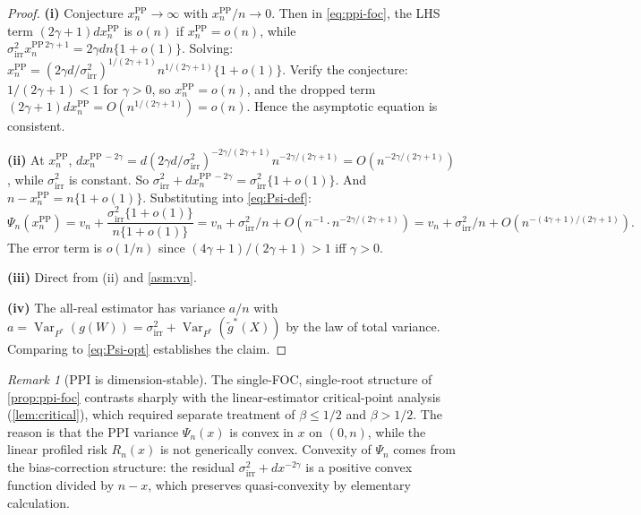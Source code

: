 \documentclass[11pt]{article}
\theoremstyle{plain}
\theoremstyle{definition}
\theoremstyle{remark}
\newtheorem{remark}[theorem]{Remark}
\newcommand{\Var}{\operatorname{Var}}
\begin{document}
\begin{proof}
\textbf{(i)} Conjecture $x_n^{\mathrm{PP}}\to\infty$ with $x_n^{\mathrm{PP}}/n\to0$. Then in \cref{eq:ppi-foc}, the LHS term $(2\gamma+1)dx_n^{\mathrm{PP}}$ is $o(n)$ if $x_n^{\mathrm{PP}}=o(n)$, while $\sigma_{\mathrm{irr}}^2 x_n^{\mathrm{PP}\,2\gamma+1}=2\gamma dn\{1+o(1)\}$. Solving: $x_n^{\mathrm{PP}}=(2\gamma d/\sigma_{\mathrm{irr}}^2)^{1/(2\gamma+1)} n^{1/(2\gamma+1)}\{1+o(1)\}$. Verify the conjecture: $1/(2\gamma+1)<1$ for $\gamma>0$, so $x_n^{\mathrm{PP}}=o(n)$, and the dropped term $(2\gamma+1)dx_n^{\mathrm{PP}}=O(n^{1/(2\gamma+1)})=o(n)$. Hence the asymptotic equation is consistent.

\textbf{(ii)} At $x_n^{\mathrm{PP}}$, $dx_n^{\mathrm{PP}\,-2\gamma}=d(2\gamma d/\sigma_{\mathrm{irr}}^2)^{-2\gamma/(2\gamma+1)} n^{-2\gamma/(2\gamma+1)}=O(n^{-2\gamma/(2\gamma+1)})$, while $\sigma_{\mathrm{irr}}^2$ is constant. So $\sigma_{\mathrm{irr}}^2+dx_n^{\mathrm{PP}\,-2\gamma}=\sigma_{\mathrm{irr}}^2\{1+o(1)\}$. And $n-x_n^{\mathrm{PP}}=n\{1+o(1)\}$. Substituting into \cref{eq:Psi-def}:
\begin{equation*}
\Psi_n(x_n^{\mathrm{PP}})=v_n+\frac{\sigma_{\mathrm{irr}}^2\{1+o(1)\}}{n\{1+o(1)\}}=v_n+\sigma_{\mathrm{irr}}^2/n+O(n^{-1}\cdot n^{-2\gamma/(2\gamma+1)})=v_n+\sigma_{\mathrm{irr}}^2/n+O(n^{-(4\gamma+1)/(2\gamma+1)}).
\end{equation*}
The error term is $o(1/n)$ since $(4\gamma+1)/(2\gamma+1)>1$ iff $\gamma>0$.

\textbf{(iii)} Direct from (ii) and \cref{asm:vn}.

\textbf{(iv)} The all-real estimator has variance $a/n$ with $a=\Var_{P^*}(g(W))=\sigma_{\mathrm{irr}}^2+\Var_{P^*}(\tilde g^*(X))$ by the law of total variance. Comparing to \cref{eq:Psi-opt} establishes the claim.
\end{proof}

\begin{remark}[PPI is dimension-stable]\label{rem:ppi-stable}
The single-FOC, single-root structure of \cref{prop:ppi-foc} contrasts sharply with the linear-estimator critical-point analysis (\cref{lem:critical}), which required separate treatment of $\beta\le1/2$ and $\beta>1/2$. The reason is that the PPI variance $\Psi_n(x)$ is convex in $x$ on $(0,n)$, while the linear profiled risk $R_n(x)$ is not generically convex. Convexity of $\Psi_n$ comes from the bias-correction structure: the residual $\sigma_{\mathrm{irr}}^2+dx^{-2\gamma}$ is a positive convex function divided by $n-x$, which preserves quasi-convexity by elementary calculation.
\end{remark}
\end{document}
